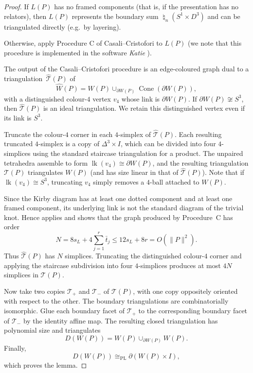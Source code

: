 \documentclass[a4paper,11pt,reqno]{amsart}
\theoremstyle{definition}
\theoremstyle{remark}
\newcommand{\PL}{\mathrm{PL}}
\newcommand{\bs}{\mathbin{\natural}}
\begin{document}
	\begin{proof}
		If $L(P)$ has no framed components (that is, if the presentation has no relators), then $L(P)$ represents the boundary sum $\bs_n (S^1\times D^3)$ and can be triangulated directly (e.g.\ by layering). 
		
		Otherwise, apply Procedure C of Casali--Cristofori
		\cite[Proposition~6, Theorems~7 and~12]
		{CasaliCristofori} to $L(P)$ (we note that this procedure is implemented in the software \emph{Katie} \cite{Burke-software}).
		
		The output of the Casali--Cristofori procedure is an edge-coloured graph dual to a triangulation~$\widehat{\mathcal{T}}(P)$ of 
		\[
		\widehat{W}(P)=W(P)\cup_{\partial W(P)}\operatorname{Cone}(\partial W(P)),
		\]
		with a distinguished colour-$4$ vertex $v_4$ whose link is $\partial W(P)$. If $\partial W(P)\not\cong S^3$, then $\widehat{\mathcal{T}}(P)$ is an ideal triangulation. We retain this distinguished vertex even if its link is $S^3$. 
		
		Truncate the colour-$4$ corner in each $4$-simplex of $\widehat{\mathcal{T}}(P)$. Each resulting truncated $4$-simplex is a copy of $\Delta^3\times I$, which can be divided into four $4$-simplices using the standard staircase triangulation for a product. The unpaired tetrahedra assemble to form $\operatorname{lk}(v_4)\cong\partial W(P)$, and the resulting triangulation $\mathcal{T}(P)$ triangulates $W(P)$ (and has size linear in that of $\widehat{\mathcal{T}}(P)$). Note that if $\operatorname{lk}(v_4)\cong S^3$, truncating $v_4$ simply removes a $4$-ball attached to $W(P)$.
		
		Since the Kirby diagram has at least one dotted component and
		at least one framed component, its underlying link is not the
		standard diagram of the trivial knot. Hence
		\cite[Theorem~12]{CasaliCristofori} applies and shows that the graph
		produced by Procedure~C has order
		\[
		N
		=
		8s_{L}
		+4\sum_{j=1}^{r}\bar t_j
		\le
		12s_{L}+8r
		=
		O(\|P\|^2).
		\]
		Thus $\widehat{\mathcal T}(P)$ has $N$ simplices. Truncating the
		distinguished colour-$4$ corner and applying the
		staircase subdivision into four $4$-simplices produces at most $4N$ simplices in
		$\mathcal T(P)$.
		
		Now take two copies $\mathcal{T}_+$ and $\mathcal{T}_-$ of $\mathcal T(P)$, with one copy oppositely
		oriented with respect to the other. The boundary triangulations are combinatorially isomorphic. Glue each boundary facet of $\mathcal{T}_+$ to the corresponding boundary facet of $\mathcal{T}_-$ by the identity affine map. The resulting closed triangulation has polynomial
		size and triangulates
		\[
		D(W(P))=W(P)\cup_{\partial W(P)}W(P).
		\]
		Finally,
		\[
		D(W(P))\cong_{\PL}\partial(W(P)\times I),
		\]
		which proves the lemma.
	\end{proof}
	
\end{document}
